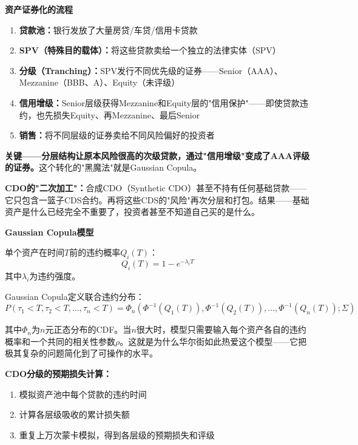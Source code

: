 \documentclass[a4paper,11pt]{ctexbook}
\begin{document}
\begin{qualitative}
\textbf{资产证券化的流程}

\begin{enumerate}
  \item \textbf{贷款池：}银行发放了大量房贷/车贷/信用卡贷款
  \item \textbf{SPV（特殊目的载体）：}将这些贷款卖给一个独立的法律实体（SPV）
  \item \textbf{分级（Tranching）：}SPV发行不同优先级的证券——Senior（AAA）、Mezzanine（BBB、A）、Equity（未评级）
  \item \textbf{信用增级：}Senior层级获得Mezzanine和Equity层的"信用保护"——即使贷款违约，也先损失Equity、再Mezzanine、最后Senior
  \item \textbf{销售：}将不同层级的证券卖给不同风险偏好的投资者
\end{enumerate}

\textbf{关键——分层结构让原本风险很高的次级贷款，通过"信用增级"变成了AAA评级的证券。}这个转化的"黑魔法"就是Gaussian Copula。

\textbf{CDO的"二次加工"：}合成CDO（Synthetic CDO）甚至不持有任何基础贷款——它只包含一篮子CDS合约。再将这些CDS的"风险"再次分层和打包。结果——基础资产是什么已经完全不重要了，投资者甚至不知道自己买的是什么。
\end{qualitative}

\begin{quantitative}
\textbf{Gaussian Copula模型}

单个资产在时间$T$前的违约概率$Q_i(T)$：
\[
Q_i(T) = 1 - e^{-\lambda_i T}
\]
其中$\lambda_i$为违约强度。

Gaussian Copula定义联合违约分布：
\[
P(\tau_1 < T, \tau_2 < T, \ldots, \tau_n < T) = \Phi_n(\Phi^{-1}(Q_1(T)), \Phi^{-1}(Q_2(T)), \ldots, \Phi^{-1}(Q_n(T)); \Sigma)
\]

其中$\Phi_n$为$n$元正态分布的CDF。当$n$很大时，模型只需要输入每个资产各自的违约概率和一个共同的相关性参数$\rho$。这就是为什么华尔街如此热爱这个模型——它把极其复杂的问题简化到了可操作的水平。

\textbf{CDO分级的预期损失计算：}
\begin{enumerate}
  \item 模拟资产池中每个贷款的违约时间
  \item 计算各层级吸收的累计损失额
  \item 重复上万次蒙卡模拟，得到各层级的预期损失和评级
\end{enumerate}
\end{quantitative}
\end{document}

